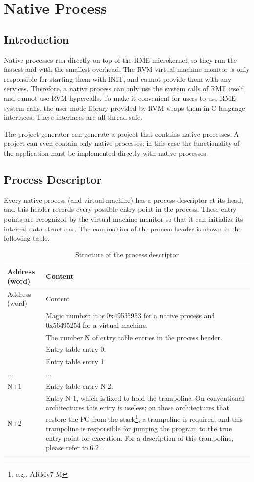\chapter{Native Process}\label{ch:3-native-process}

\section{Introduction}\label{sec:3-1}

Native processes run directly on top of the RME microkernel, so they run the fastest and with the smallest overhead. The RVM virtual machine monitor is only responsible for starting them with INIT, and cannot provide them with any services. Therefore, a native process can only use the system calls of RME itself, and cannot use RVM hypercalls. To make it convenient for users to use RME system calls, the user-mode library provided by RVM wraps them in C language interfaces. These interfaces are all thread-safe.

The project generator can generate a project that contains native processes. A project can even contain only native processes; in this case the functionality of the application must be implemented directly with native processes.

\section{Process Descriptor}\label{sec:3-2}

Every native process (and virtual machine) has a process descriptor at its head, and this header records every possible entry point in the process. These entry points are recognized by the virtual machine monitor so that it can initialize its internal data structures. The composition of the process header is shown in the following table.

\begin{xltabular}{\textwidth}{@{}>{\hsize\raggedright\arraybackslash}X>{\hsize\raggedright\arraybackslash}X@{}}
\caption{Structure of the process descriptor}\label{tab:3-1}\\
\toprule
Address (word) & Content\tabularnewline
\endfirsthead
\toprule
Address (word) & Content\tabularnewline
\midrule
\endhead
\bottomrule
{} &
Magic number; it is 0x49535953 for a native process and 0x56495254 for a virtual machine. & The number N of entry table entries in the process header. & Entry table entry 0. & Entry table entry 1.\tabularnewline
... & ...\tabularnewline
N+1 & Entry table entry N-2.\tabularnewline
N+2 &
Entry N-1, which is fixed to hold the trampoline. On conventional architectures this entry is useless; on those architectures that restore the PC from the stack\footnote{e.g., ARMv7-M}, a trampoline is required, and this trampoline is responsible for jumping the program to the true entry point for execution. For a description of this trampoline, please refer to.6.2
.\tabularnewline
\end{xltabular}

